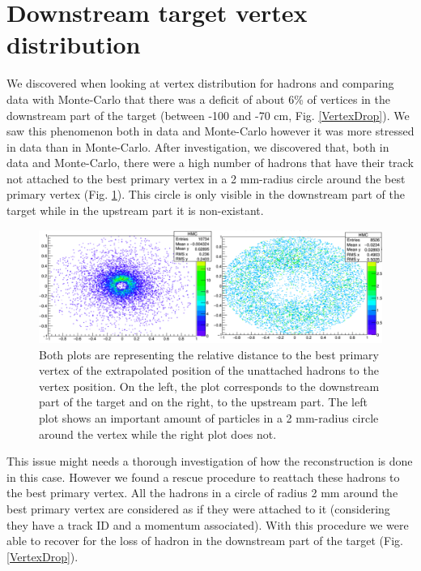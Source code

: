 
\section{Downstream target vertex distribution}

We discovered when looking at vertex distribution for hadrons and comparing data with Monte-Carlo that there was a deficit of about 6\% of vertices in the downstream part of the target (between -100 and -70 cm, Fig. \ref{VertexDrop}). We saw this phenomenon both in data and Monte-Carlo however it was more stressed in data than in Monte-Carlo. After investigation, we discovered that, both in data and Monte-Carlo, there were a high number of hadrons that have their track not attached to the best primary vertex in a 2 mm-radius circle around the best primary vertex (Fig. \ref{CircleHadron}). This circle is only visible in the downstream part of the target while in the upstream part it is non-existant.

\begin{figure}[!h]
	\includegraphics[scale=0.45]{./gfx/CircleHadron.png}
	\caption{Both plots are representing the relative distance to the best primary vertex of the extrapolated position of the unattached hadrons to the vertex position. On the left, the plot corresponds to the downstream part of the target and on the right, to the upstream part. The left plot shows an important amount of particles in a 2 mm-radius circle around the vertex while the right plot does not.}
	\label{CircleHadron}
\end{figure}

This issue might needs a thorough investigation of how the reconstruction is done in this case. However we found a rescue procedure to reattach these hadrons to the best primary vertex. All the hadrons in a circle of radius 2 mm around the best primary vertex are considered as if they were attached to it (considering they have a track ID and a momentum associated). With this procedure we were able to recover for the loss of hadron in the downstream part of the target (Fig. \ref{VertexDrop}).

